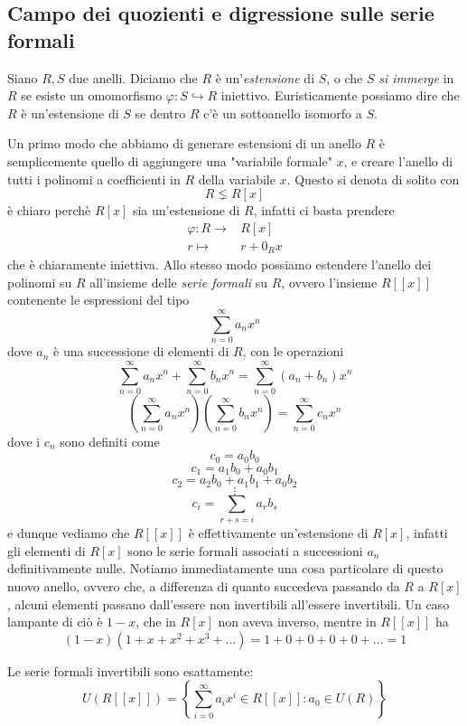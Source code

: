 \documentclass[11pt]{scrartcl}
\newcommand{\inj}{\hookrightarrow}
\begin{document}
	\subsection{Campo dei quozienti e digressione sulle serie formali}
	\begin{definition}
		Siano $R,S$ due anelli. Diciamo che $R$ è un'\textit{estensione} di $S$, o che $S$ \textit{si immerge} in $R$ se esiste un omomorfismo $\varphi:S\inj R$ iniettivo. Euristicamente possiamo dire che $R$ è un'estensione di $S$ se dentro $R$ c'è un sottoanello isomorfo a $S$.
	\end{definition}
	Un primo modo che abbiamo di generare estensioni di un anello $R$ è semplicemente quello di aggiungere una "variabile formale" $x$, e creare l'anello di tutti i polinomi a coefficienti in $R$ della variabile $x$. Questo si denota di solito con 
	$$R\lneq R[x]$$
	è chiaro perchè $R[x]$ sia un'estensione di $R$, infatti ci basta prendere
	\begin{align*}
		\varphi:R\to & R[x] \\
		r \mapsto & r+0_Rx
	\end{align*}
	che è chiaramente iniettiva. Allo stesso modo possiamo estendere l'anello dei polinomi su $R$ all'insieme delle \textit{serie formali} su $R$, ovvero l'insieme $R[[x]]$ contenente le espressioni del tipo
	$$\sum_{n=0}^\infty a_nx^n$$
	dove $a_n$ è una successione di elementi di $R$, con le operazioni
	$$\sum_{n=0}^\infty a_nx^n+\sum_{n=0}^\infty b_nx^n=\sum_{n=0}^\infty (a_n+b_n)x^n$$
	$$\left(\sum_{n=0}^\infty a_nx^n\right)\left(\sum_{n=0}^\infty b_nx^n\right)=\sum_{n=0}^\infty c_nx^n$$
	dove i $c_n$ sono definiti come
	$$c_0=a_0b_0$$
	$$c_1=a_1b_0+a_0b_1$$
	$$c_2=a_2b_0+a_1b_1+a_0b_2$$
	$$\vdots$$
	$$c_i=\sum_{r+s=i}a_rb_s$$
	e dunque vediamo che $R[[x]]$ è effettivamente un'estensione di $R[x]$, infatti gli elementi di $R[x]$ sono le serie formali associati a successioni $a_n$ definitivamente nulle. Notiamo immediatamente una cosa particolare di questo nuovo anello, ovvero che, a differenza di quanto succedeva passando da $R$ a $R[x]$, alcuni elementi passano dall'essere non invertibili all'essere invertibili. Un caso lampante di ciò è $1-x$, che in $R[x]$ non aveva inverso, mentre in $R[[x]]$ ha
	$$(1-x)(1+x+x^2+x^3+\dots)=1+0+0+0+0+\dots=1$$
	\begin{proposition}
		Le serie formali invertibili sono esattamente:
		$$U\left(R[[x]]\right)=\left\{\sum_{i=0}^{\infty}a_ix^i\in R[[x]]:a_0\in U(R)\right\}$$
	\end{proposition}
\end{document}
